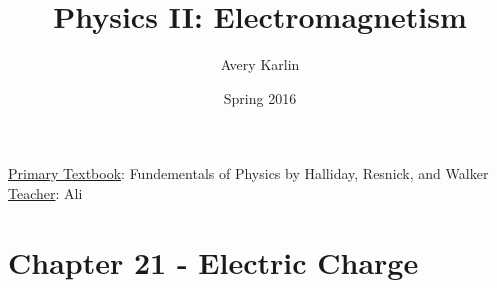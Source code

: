 \documentclass[11 pt, twoside]{article}
\begin{document}
\title{Physics II: Electromagnetism}
\author{Avery Karlin}
\date{Spring 2016}
\newcommand{\textbook}{Fundementals of Physics by Halliday, Resnick, and Walker}
\newcommand{\teacher}{Ali}

\maketitle
\newpage
\hypertarget{content}{\tableofcontents}
\vspace{11pt}
\noindent
\underline{Primary Textbook}: \textbook\\
\underline{Teacher}: \teacher
\newpage

\section{Chapter 21 - Electric Charge}
\end{document}
